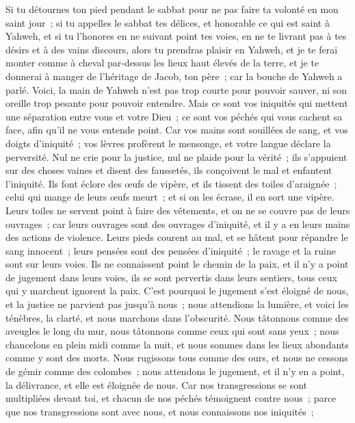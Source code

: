 \begin{multicols}{2}
Si tu détournes ton pied pendant le sabbat pour ne pas faire ta volonté en mon saint jour~; si tu appelles le sabbat tes délices, et honorable ce qui est saint à Yahweh, et si tu l'honores en ne suivant point tes voies, en ne te livrant pas à tes désirs et à des vains discours,
alors tu prendras plaisir en Yahweh, et je te ferai monter comme à cheval par-dessus les lieux haut élevés de la terre, et je te donnerai à manger de l'héritage de Jacob, ton père~; car la bouche de Yahweh a parlé.
\VerseOne{}Voici, la main de Yahweh n'est pas trop courte pour pouvoir sauver, ni son oreille trop pesante pour pouvoir entendre.
Mais ce sont vos iniquités qui mettent une séparation entre vous et votre Dieu~; ce sont vos péchés qui vous cachent sa face, afin qu'il ne vous entende point.
Car vos mains sont souillées de sang, et vos doigts d'iniquité~; vos lèvres profèrent le mensonge, et votre langue déclare la perversité.
Nul ne crie pour la justice, nul ne plaide pour la vérité~; ils s'appuient sur des choses vaines et disent des faussetés, ils conçoivent le mal et enfantent l'iniquité.
Ils font éclore des œufs de vipère, et ils tissent des toiles d'araignée~; celui qui mange de leurs œufs meurt~; et si on les écrase, il en sort une vipère.
Leurs toiles ne servent point à faire des vêtements, et on ne se couvre pas de leurs ouvrages~; car leurs ouvrages sont des ouvrages d'iniquité, et il y a en leurs mains des actions de violence.
Leurs pieds courent au mal, et se hâtent pour répandre le sang innocent~; leurs pensées sont des pensées d'iniquité~; le ravage et la ruine sont sur leurs voies.
Ils ne connaissent point le chemin de la paix, et il n'y a point de jugement dans leurs voies, ils se sont pervertis dans leurs sentiers, tous ceux qui y marchent ignorent la paix.
C'est pourquoi le jugement s'est éloigné de nous, et la justice ne parvient pas jusqu'à nous~; nous attendions la lumière, et voici les ténèbres, la clarté, et nous marchons dans l'obscurité.
Nous tâtonnons comme des aveugles le long du mur, nous tâtonnons comme ceux qui sont sans yeux~; nous chancelons en plein midi comme la nuit, et nous sommes dans les lieux abondants comme y sont des morts.
Nous rugissons tous comme des ours, et nous ne cessons de gémir comme des colombes~; nous attendons le jugement, et il n'y en a point, la délivrance, et elle est éloignée de nous.
Car nos transgressions se sont multipliées devant toi, et chacun de nos péchés témoignent contre nous~; parce que nos transgressions sont avec nous, et nous connaissons nos iniquités~;

\end{multicols}

